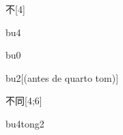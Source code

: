 \begin{verbete}[bu4]{不}[4]
\begin{pronuncia}{bu4}
\end{pronuncia}
\begin{pronuncia}{bu0}
\end{pronuncia}
\begin{pronuncia}{bu2}[(antes de quarto tom)]
\end{pronuncia}
\end{verbete}

\begin{verbete}[bu4tong2]{不同}[4;6]
\begin{pronuncia}{bu4tong2}
\end{pronuncia}
\end{verbete}

